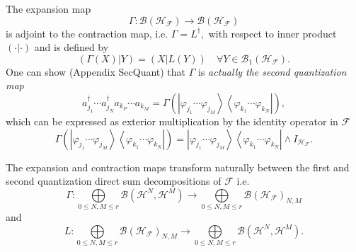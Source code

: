 \documentclass[aps,preprint]{revtex4}%
\begin{document}
The expansion map
\begin{equation}
\Gamma:\mathcal{B}\left(  \mathcal{H}_{\mathcal{F}}\right)  \rightarrow
\mathcal{B}\left(  \mathcal{H}_{\mathcal{F}}\right)
\end{equation}
is adjoint to the contraction map, i.e. $\Gamma=L^{\dagger},$ with respect to
inner product $\left(  \cdot\left\vert \cdot\right.  \right)  $ and is defined
by
\begin{equation}
\left(  \Gamma\left(  X\right)  \left\vert Y\right.  \right)  =\left(
X\left\vert L\left(  Y\right)  \right.  \right)  \quad\forall Y\in
\mathcal{B}_{1}\left(  \mathcal{H}_{\mathcal{F}}\right)  .
\end{equation}
One can show (Appendix SecQuant) that $\Gamma$ is \emph{actually the second
quantization map}
\begin{equation}
a_{j_{1}}^{\dagger}\cdots a_{j_{N}}^{\dagger}a_{k_{P}}\cdots a_{k_{M}}%
=\Gamma\left(  \left\vert \varphi_{j_{1}}\cdots\varphi_{j_{M}}\right\rangle
\left\langle \varphi_{k_{1}}\cdots\varphi_{k_{N}}\right\vert \right)  ,
\end{equation}
which can be expressed as exterior multiplication by the identity operator in
$\mathcal{F}$
\begin{equation}
\Gamma\left(  \left\vert \varphi_{j_{1}}\cdots\varphi_{j_{M}}\right\rangle
\left\langle \varphi_{k_{1}}\cdots\varphi_{k_{N}}\right\vert \right)
=\left\vert \varphi_{j_{1}}\cdots\varphi_{j_{M}}\right\rangle \left\langle
\varphi_{k_{1}}\cdots\varphi_{k_{N}}\right\vert \wedge I_{\mathcal{H}%
_{\mathcal{F}}}.
\end{equation}


The expansion and contraction maps transform naturally between the first and
second quantization direct sum decompositions of $\mathcal{F}$ i.e.
\begin{equation}
\Gamma:%
{\displaystyle\bigoplus\limits_{0\leq N,M\leq r}}
\mathcal{B}\left(  \mathcal{H}^{N},\mathcal{H}^{M}\right)  \rightarrow%
{\displaystyle\bigoplus\limits_{0\leq N,M\leq r}}
\mathcal{B}\left(  \mathcal{H}_{\mathcal{F}}\right)  _{N,M}%
\end{equation}
and
\begin{equation}
L:%
{\displaystyle\bigoplus\limits_{0\leq N,M\leq r}}
\mathcal{B}\left(  \mathcal{H}_{\mathcal{F}}\right)  _{N,M}\rightarrow%
{\displaystyle\bigoplus\limits_{0\leq N,M\leq r}}
\mathcal{B}\left(  \mathcal{H}^{N},\mathcal{H}^{M}\right)  .
\end{equation}
\end{document}
